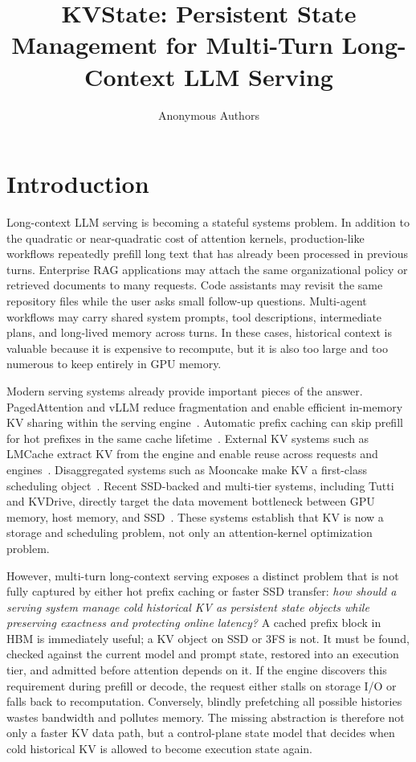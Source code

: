 \documentclass[sigconf,review,anonymous]{acmart}
\title{KVState: Persistent State Management for Multi-Turn Long-Context LLM Serving}
\author{Anonymous Authors}
\affiliation{%
  \institution{Anonymous Institution}
  \country{}
}
\begin{document}
\maketitle

\section{Introduction}

Long-context LLM serving is becoming a stateful systems problem. In addition to
the quadratic or near-quadratic cost of attention kernels, production-like
workflows repeatedly prefill long text that has already been processed in
previous turns. Enterprise RAG applications may attach the same organizational
policy or retrieved documents to many requests. Code assistants may revisit the
same repository files while the user asks small follow-up questions. Multi-agent
workflows may carry shared system prompts, tool descriptions, intermediate
plans, and long-lived memory across turns. In these cases, historical context is
valuable because it is expensive to recompute, but it is also too large and too
numerous to keep entirely in GPU memory.

Modern serving systems already provide important pieces of the answer.
PagedAttention and vLLM reduce fragmentation and enable efficient in-memory KV
sharing within the serving engine~\citep{kwon2023pagedattention}. Automatic
prefix caching can skip prefill for hot prefixes in the same cache
lifetime~\citep{vllmPrefixCaching}. External KV systems such as LMCache extract
KV from the engine and enable reuse across requests and
engines~\citep{liu2025lmcache}. Disaggregated systems such as Mooncake make KV
a first-class scheduling object~\citep{qin2024mooncake}. Recent SSD-backed and
multi-tier systems, including Tutti and KVDrive, directly target the data
movement bottleneck between GPU memory, host memory, and
SSD~\citep{qiu2026tutti,lin2026kvdrive}. These systems establish that KV is now
a storage and scheduling problem, not only an attention-kernel optimization
problem.

However, multi-turn long-context serving exposes a distinct problem that is not
fully captured by either hot prefix caching or faster SSD transfer:
\emph{how should a serving system manage cold historical KV as persistent state
objects while preserving exactness and protecting online latency?} A cached
prefix block in HBM is immediately useful; a KV object on SSD or 3FS is not. It
must be found, checked against the current model and prompt state, restored into
an execution tier, and admitted before attention depends on it. If the engine
discovers this requirement during prefill or decode, the request either stalls
on storage I/O or falls back to recomputation. Conversely, blindly prefetching
all possible histories wastes bandwidth and pollutes memory. The missing
abstraction is therefore not only a faster KV data path, but a control-plane
state model that decides when cold historical KV is allowed to become execution
state again.
\end{document}
